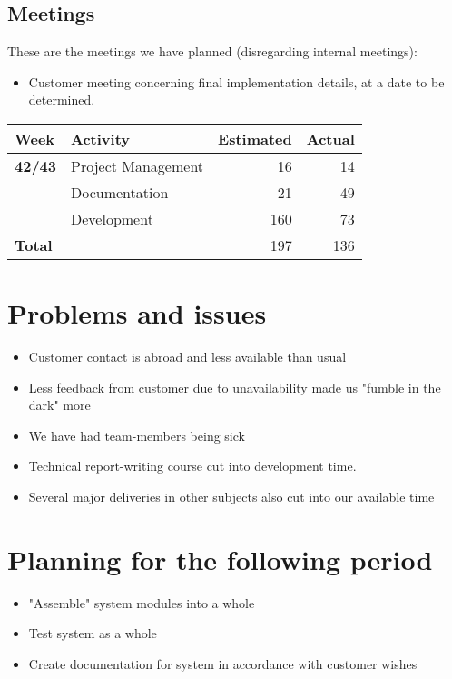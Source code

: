 \documentclass[12pt, a4paper]{article}
\begin{document}
\subsection{Meetings}
These are the meetings we have planned (disregarding internal meetings):\\
\begin{itemize}
\item Customer meeting concerning final implementation details, at a date to be determined.
\end{itemize}
  \begin{tabular}{| l | l | r | r |}
    \hline
    \textbf{Week} & \textbf{Activity} & \textbf{Estimated} & \textbf{Actual}\\ \hline
    \textbf{42/43} & Project Management & 16 & 14 \\ \hline
     & Documentation & 21 & 49 \\ \hline
     & Development & 160 & 73 \\ \hline
     \textbf{Total }&  & 197 & 136 \\
    \hline
  \end{tabular}

\section{Problems and issues}
\begin{itemize}
\item Customer contact is abroad and less available than usual
\item Less feedback from customer due to unavailability made us "fumble in the dark" more
\item We have had team-members being sick
\item Technical report-writing course cut into development time.
\item Several major deliveries in other subjects also cut into our available time
\end{itemize}

\section{Planning for the following period}
\begin{itemize}
\item "Assemble" system modules into a whole
\item Test system as a whole
\item Create documentation for system in accordance with customer wishes
\end{itemize}
\end{document}
